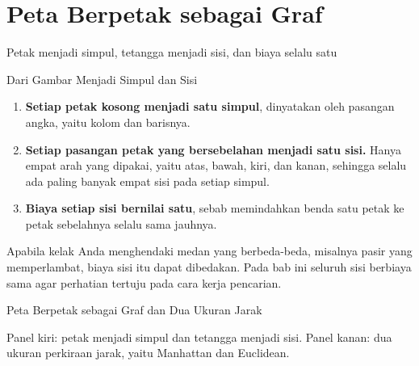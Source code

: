 \documentclass[aspectratio=169,10pt]{beamer}
\begin{document}
\section{Peta Berpetak sebagai Graf}
  {Petak menjadi simpul, tetangga menjadi sisi, dan biaya selalu satu}

\begin{frame}{Dari Gambar Menjadi Simpul dan Sisi}
\begin{enumerate}
  \item \textbf{Setiap petak kosong menjadi satu simpul}, dinyatakan oleh
        pasangan angka, yaitu kolom dan barisnya.
  \item \textbf{Setiap pasangan petak yang bersebelahan menjadi satu sisi.}
        Hanya empat arah yang dipakai, yaitu atas, bawah, kiri, dan kanan,
        sehingga selalu ada paling banyak empat sisi pada setiap simpul.
  \item \textbf{Biaya setiap sisi bernilai satu}, sebab memindahkan benda satu
        petak ke petak sebelahnya selalu sama jauhnya.
\end{enumerate}
\vspace{0.12cm}
\begin{kotak}
Apabila kelak Anda menghendaki medan yang berbeda-beda, misalnya pasir yang
memperlambat, biaya sisi itu dapat dibedakan. Pada bab ini seluruh sisi
berbiaya sama agar perhatian tertuju pada cara kerja pencarian.
\end{kotak}
\end{frame}

\begin{frame}{Peta Berpetak sebagai Graf dan Dua Ukuran Jarak}
\centering
{}
\vspace{0.10cm}
\begin{kotak}
Panel kiri: petak menjadi simpul dan tetangga menjadi sisi. Panel kanan: dua
ukuran perkiraan jarak, yaitu Manhattan dan Euclidean.
\end{kotak}
\end{frame}
\end{document}
